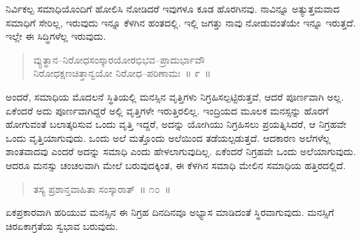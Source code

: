 \vspace{-0.4cm}


\vspace{0.1cm}

ನಿರ್ವಿಕಲ್ಪ ಸಮಾಧಿಯೊಂದಿಗೆ ಹೋಲಿಸಿ ನೋಡಿದರೆ ಇವುಗಳೂ ಕೂಡ ಹೊರಗಿನವು. ನಾವಿನ್ನೂ ಅತ್ಯುತ್ತಮವಾದ ಸಮಾಧಿಗೆ ಸೇರಿಲ್ಲ, ಇರುವುದು ಇನ್ನೂ ಕೆಳಗಿನ ಹಂತದಲ್ಲಿ. ಇಲ್ಲಿ ಜಗತ್ತು ನಾವು ನೋಡುವಂತೆಯೇ ಇನ್ನೂ ಇರುತ್ತದೆ. ಇಲ್ಲೇ ಈ ಸಿದ್ಧಿಗಳೆಲ್ಲ ಇರುವುದು. 

\vspace{-0.3cm}

\begin{verse}
ವ್ಯುತ್ಥಾನ–ನಿರೋಧಸಂಸ್ಕಾರಯೋರಭಿಭವ–ಪ್ರಾದುರ್ಭಾವೌ\\ನಿರೋಧಕ್ಷಣಚಿತ್ತಾನ್ವಯೋ ನಿರೋಧ–ಪರಿಣಾಮಃ~॥ ೯~॥
\end{verse}

\vspace{-0.35cm}


\vspace{0.1cm}

ಅಂದರೆ, ಸಮಾಧಿಯ ಮೊದಲನೆ ಸ್ಥಿತಿಯಲ್ಲಿ ಮನಸ್ಸಿನ ವೃತ್ತಿಗಳು ನಿಗ್ರಹಿಸಲ್ಪಟ್ಟಿರುತ್ತವೆ, ಆದರೆ ಪೂರ್ಣವಾಗಿ ಅಲ್ಲ. ಏಕೆಂದರೆ ಅದು ಪೂರ್ಣವಾಗಿದ್ದರೆ ಅಲ್ಲಿ ವೃತ್ತಿಗಳೇ ಇರುತ್ತಿರಲಿಲ್ಲ. ಇಂದ್ರಿಯದ ಮೂಲಕ ಮನಸ್ಸನ್ನು ಹೊರಗೆ ಹೋಗುವಂತೆ ಬಲಾತ್ಕರಿಸುವ ಒಂದು ವೃತ್ತಿ ಇದ್ದರೆ, ಅದನ್ನು ಯೋಗಿಯು ನಿಗ್ರಹಿಸಲು ಪ್ರಯತ್ನಿಸಿದರೆ, ಆ ನಿಗ್ರಹವೇ ಒಂದು ವೃತ್ತಿಯಾಗುವುದು. ಒಂದು ಅಲೆ ಮತ್ತೊಂದು ಅಲೆಯಿಂದ ತಡೆಯಲ್ಪಡುತ್ತದೆ. ಆದಕಾರಣ ಅಲೆಗಳೆಲ್ಲ ಶಾಂತವಾದವು ಎಂದರೆ ಅದನ್ನು ಸಮಾಧಿ ಎಂದು ಹೇಳಲಾಗುವುದಿಲ್ಲ. ಏಕೆಂದರೆ ನಿಗ್ರಹವೇ ಒಂದು ಅಲೆಯಾಗುವುದು. ಆದರೂ ಮನಸ್ಸು ಚಂಚಲವಾಗಿ ಮೇಲೆ ಬರುವುದಕ್ಕಿಂತ, ಈ ಕೆಳಗಿನ ಸಮಾಧಿ ಮೇಲಿನ ಸಮಾಧಿಯ ಹತ್ತಿರದಲ್ಲಿದೆ. 

\vspace{-0.25cm}

\begin{verse}
ತಸ್ಯ ಪ್ರಶಾನ್ತವಾಹಿತಾ ಸಂಸ್ಕಾರಾತ್​~॥ ೧೦~॥
\end{verse}

\vspace{-0.42cm}


\vspace{0.1cm}

ಏಕಪ್ರಕಾರವಾಗಿ ಹರಿಯುವ ಮನಸ್ಸಿನ ಈ ನಿಗ್ರಹ ದಿನದಿನವೂ ಅಭ್ಯಾಸ ಮಾಡಿದಂತೆ ಸ್ಥಿರವಾಗುವುದು. ಮನಸ್ಸಿಗೆ ಚಿರಏಕಾಗ್ರತೆಯ ಸ್ವಭಾವ ಬರುವುದು. 


